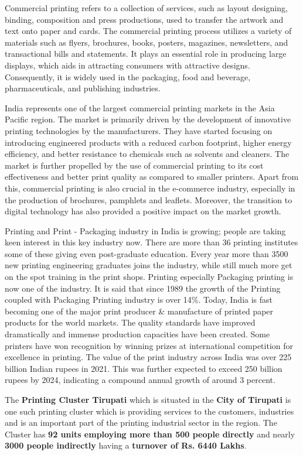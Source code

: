 Commercial printing refers to a collection of services, such as layout
designing, binding, composition and press productions, used to transfer the
artwork and text onto paper and cards. The commercial printing process utilizes
a variety of materials such as flyers, brochures, books, posters, magazines,
newsletters, and transactional bills and statements. It plays an essential role in producing large displays, which aids in attracting consumers with attractive
designs. Consequently, it is widely used in the packaging, food and beverage,
pharmaceuticals, and publishing industries.


India represents one of the largest commercial printing markets in the Asia
Pacific region. The market is primarily driven by the development of innovative
printing technologies by the manufacturers. They have started focusing on
introducing engineered products with a reduced carbon footprint, higher energy
efficiency, and better resistance to chemicals such as solvents and cleaners. The market is further propelled by the use of commercial printing to its cost effectiveness and better print quality as compared to smaller printers. Apart from this, commercial printing is also crucial in the e-commerce industry, especially in the production of brochures, pamphlets and leaflets. Moreover, the transition to digital technology has also provided a positive impact on the market growth.

Printing and Print - Packaging industry in India is growing; people are
taking keen interest in this key industry now. There are more than 36 printing
institutes some of these giving even post-graduate education. Every year more
than 3500 new printing engineering graduates joins the industry, while still much more get on the spot training in the print shops. Printing especially Packaging printing is now one of the industry. It is said that since 1989 the growth of the Printing coupled with Packaging Printing industry is over 14\%. Today, India is fast becoming one of the major print producer \& manufacture of printed paper products for the world markets. The quality standards have improved dramatically and immense production capacities have been created. Some
printers have won recognition by winning prizes at international competition for
excellence in printing. The value of the print industry across India was over 225 billion Indian rupees in 2021. This was further expected to exceed 250 billion rupees by 2024, indicating a compound annual growth of around 3 percent.

The \textbf{Printing Cluster Tirupati} which is situated in the \textbf{City of Tirupati} is one such printing cluster which is providing services to the customers, industries and is an important part of the printing industrial sector in the region. The Cluster has \textbf{92 units employing more than 500 people directly} and nearly \textbf{3000 people indirectly} having a \textbf{turnover of Rs. 6440 Lakhs}.

